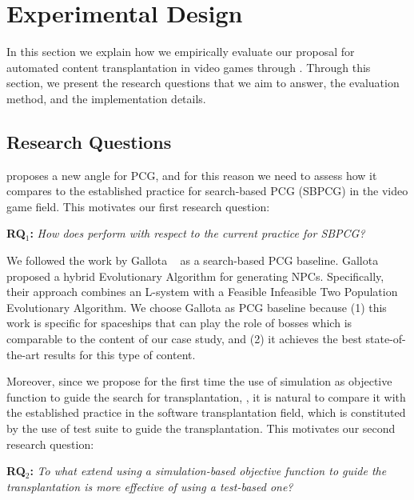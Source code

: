 \section{Experimental Design} 
\label{sec:Evaluation}

In this section we explain how we empirically evaluate our proposal for automated content transplantation in video games through \ApproachName{}. 
Through this section, we present the research questions that we aim to answer, the evaluation method, and the implementation details.

\subsection{Research Questions}

\ApproachName{} proposes a new angle for PCG, and for this reason we need to assess how it compares to the established practice for search-based PCG (SBPCG)  in the video game field. This motivates our first research question:

\textbf{RQ$_1$: }\textit{How does \simhotep{} perform with respect to the current practice for SBPCG?}

We followed the work by Gallota \etal~\cite{gallotta2022evolving} as a search-based  PCG baseline. Gallota \etal proposed a hybrid Evolutionary Algorithm for generating NPCs. Specifically, their approach combines an L-system with a Feasible Infeasible Two Population Evolutionary Algorithm. We choose Gallota \etal as PCG baseline because (1) this work is specific for spaceships that can play the role of bosses which is comparable to the content of our case study, and (2) it achieves the best state-of-the-art results for this type of content. 

Moreover,  since we propose for the first time the use of simulation as objective function to guide the search for transplantation, \simhotep, it is natural to compare it with the established practice in the software transplantation field, which is constituted by the use of test suite to guide the transplantation. This motivates our second research question:

\textbf{RQ$_2$: }\textit{To what extend using a simulation-based objective function to guide the transplantation is more effective of using a test-based one?}


